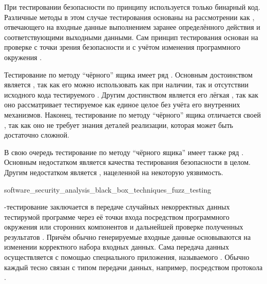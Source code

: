 %
При тестировании безопасности  по принципу  используется только бинарный код. 
%
Различные методы в этом случае тестирования основаны на рассмотрении  как , отвечающего на входные данные выполнением заранее определённого действия и соответствующими выходными данными. 
%
Сам принцип тестирования основан на проверке  с точки зрения безопасности и с учётом изменения программного окружения .

%
Тестирование по методу ``чёрного'' ящика имеет ряд  . 
%
Основным достоинством является , так как его можно использовать как при наличии, так и отсутствии исходного кода тестируемого . 
%
Другим достинством является его лёгкая , так как оно рассматривает тестируемое  как единое целое без учёта его внутренних механизмов. 
%
Наконец, тестирование по методу ``чёрного'' ящика отличается своей , так как оно не требует знания деталей реализации, которая может быть достаточно сложной.

%
В свою очередь тестирование по методу ``чёрного ящика'' имеет также ряд  . 
%
Основным недостатком является  качества тестирования безопасности  в целом. 
%
Другим недостатком является , нацеленной на некоторую уязвимость.


	{software_security_analysis_black_box_techniques_fuzz_testing}

%
-тестирование заключается в передаче случайных некорректных данных тестирумой программе через её точки входа посредством программного окружения или сторонних компонентов и дальнейшей проверке полученных результатов . 
%
Причём обычно генерируемые входные данные основываются на изменении корректного набора входных данных. 
%
Сама передача данных осуществляется с помощью специального приложения, называемого . 
%
Обычно каждый  тесно связан с типом передачи данных, например, посредством протокола . 

